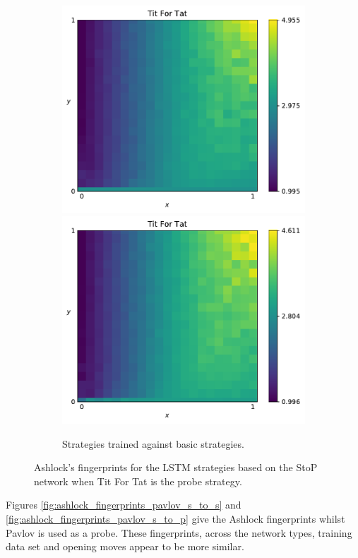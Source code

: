 \begin{figure}[!htbp]
\begin{subfigure}{\textwidth}
        \includegraphics[width=.3\textwidth]{src/chapters/07/img/tit_for_tat_basic_classification_1.pdf}
        \includegraphics[width=.3\textwidth]{src/chapters/07/img/tit_for_tat_basic_classification_0_78.pdf}
        \caption{Strategies trained against basic strategies.}
    \end{subfigure}
    \caption{Ashlock's fingerprints for the LSTM strategies based on the StoP
    network when Tit For Tat is the probe strategy.}\label{fig:ashlock_fingerprints_tft_s_to_p}
\end{figure}

Figures \ref{fig:ashlock_fingerprints_pavlov_s_to_s} and
\ref{fig:ashlock_fingerprints_pavlov_s_to_p} give the Ashlock fingerprints
whilst Pavlov is used as a probe. These fingerprints, across the network types,
training data set and opening moves appear to be more similar. 

